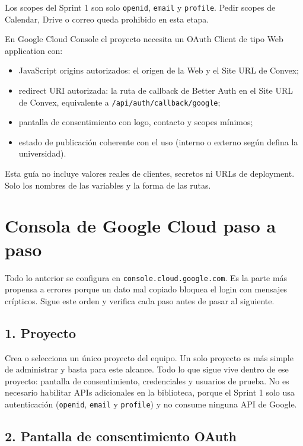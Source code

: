 \documentclass[11pt,a4paper]{article}
\begin{document}
Los scopes del Sprint 1 son solo \texttt{openid}, \texttt{email} y
\texttt{profile}. Pedir scopes de Calendar, Drive o correo queda prohibido en
esta etapa.

En Google Cloud Console el proyecto necesita un OAuth Client de tipo Web
application con:

\begin{itemize}
  \item JavaScript origins autorizados: el origen de la Web y el Site URL de
    Convex;
  \item redirect URI autorizada: la ruta de callback de Better Auth en el Site
    URL de Convex, equivalente a \texttt{/api/auth/callback/google};
  \item pantalla de consentimiento con logo, contacto y scopes mínimos;
  \item estado de publicación coherente con el uso (interno o externo según
    defina la universidad).
\end{itemize}

Esta guía no incluye valores reales de clientes, secretos ni URLs de
deployment. Solo los nombres de las variables y la forma de las rutas.

\section{Consola de Google Cloud paso a paso}

Todo lo anterior se configura en \texttt{console.cloud.google.com}. Es la
parte más propensa a errores porque un dato mal copiado bloquea el login con
mensajes crípticos. Sigue este orden y verifica cada paso antes de pasar al
siguiente.

\subsection{1. Proyecto}

Crea o selecciona un único proyecto del equipo. Un solo proyecto es más
simple de administrar y basta para este alcance. Todo lo que sigue vive
dentro de ese proyecto: pantalla de consentimiento, credenciales y usuarios
de prueba. No es necesario habilitar APIs adicionales en la biblioteca,
porque el Sprint 1 solo usa autenticación (\texttt{openid}, \texttt{email} y
\texttt{profile}) y no consume ninguna API de Google.

\subsection{2. Pantalla de consentimiento OAuth}
\end{document}
